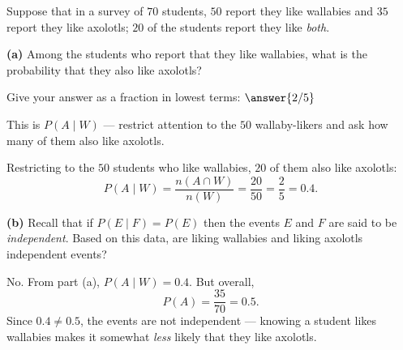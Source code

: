 \documentclass[12pt]{ximera}
\begin{document}
\begin{problem}
Suppose that in a survey of $70$ students, $50$ report they like wallabies and $35$
report they like axolotls; $20$ of the students report they like \emph{both}.

\begin{prompt}
\textbf{(a)} Among the students who report that they like wallabies, what is the
probability that they also like axolotls?

Give your answer as a fraction in lowest terms: $\answer{2/5}$

\begin{hint}
This is $P(A\mid W)$ --- restrict attention to the $50$ wallaby-likers and ask how
many of them also like axolotls.
\end{hint}

\begin{solution}
Restricting to the $50$ students who like wallabies, $20$ of them also like axolotls:
\[
P(A\mid W)=\frac{n(A\cap W)}{n(W)}=\frac{20}{50}=\frac25=0.4.
\]
\end{solution}
\end{prompt}

\begin{prompt}
\textbf{(b)} Recall that if $P(E\mid F)=P(E)$ then the events $E$ and $F$ are said to
be \emph{independent}. Based on this data, are liking wallabies and liking axolotls
independent events?

\begin{multipleChoice}
\end{multipleChoice}

\begin{solution}
No. From part (a), $P(A\mid W)=0.4$. But overall,
\[
P(A)=\frac{35}{70}=0.5.
\]
Since $0.4\neq 0.5$, the events are not independent --- knowing a student likes
wallabies makes it somewhat \emph{less} likely that they like axolotls.
\end{solution}
\end{prompt}
\end{problem}
\end{document}
